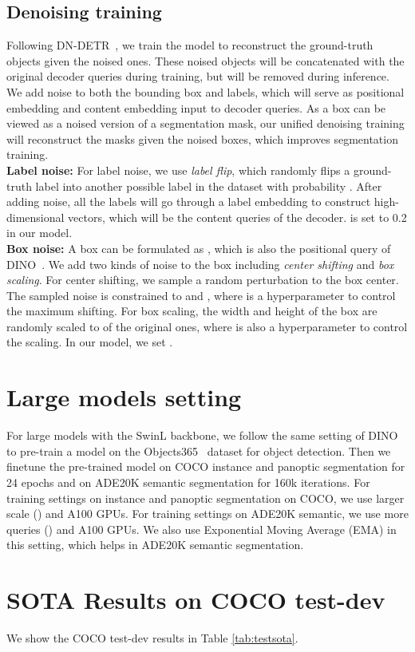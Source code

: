 \documentclass[10pt,twocolumn,letterpaper]{article}
\begin{document}
\subsection{Denoising training}\label{sec:denoise}
Following DN-DETR~\cite{li2022dn}, we train the model to reconstruct the ground-truth objects given the noised ones. These noised objects will be concatenated with the original decoder queries during training, but will be removed during inference. We add noise to both the bounding box and labels, which will serve as positional embedding and content embedding input to decoder queries. As a box can be viewed as a noised version of a segmentation mask, our unified denoising training will reconstruct the masks given the noised boxes, which improves segmentation training. 
\\\textbf{Label noise: } For label noise, we use \emph{label flip}, which randomly flips a ground-truth label into another possible label in the dataset with probability . After adding noise, all the labels will go through a label embedding to construct high-dimensional vectors, which will be the content queries of the decoder.  is set to 0.2 in our model. 
\\\textbf{Box noise: }
A box can be formulated as , which is also the positional query of DINO~\cite{zhang2022dino}. We add two kinds of noise to the box including \emph{center shifting} and \emph{box scaling}. 
For center shifting, we sample a random perturbation  to the box center. The sampled noise is constrained to  and , where  is a hyperparameter to control the maximum shifting. For box scaling, the width and height of the box are randomly scaled to  of the original ones, where  is also a hyperparameter to control the scaling. In our model, we set .


\section{Large models setting}
For large models with the SwinL backbone, we follow the same setting of DINO~\cite{zhang2022dino} to pre-train a model on the Objects365~\cite{shao2019objects365} dataset for object detection. Then we finetune the pre-trained model on COCO instance and panoptic segmentation for 24 epochs and on ADE20K semantic segmentation for 160k iterations. For training settings on instance and panoptic segmentation on COCO,  we use  larger scale () and  A100 GPUs. For training settings on ADE20K semantic, we use  more queries () and  A100 GPUs. We also use Exponential Moving Average (EMA) in this setting, which helps in ADE20K semantic segmentation.
\section{SOTA Results on COCO test-dev}
We show the COCO test-dev results in Table \ref{tab:testsota}.
\end{document}
